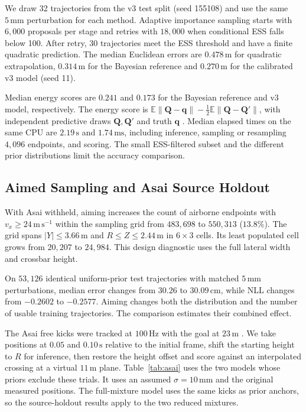 \documentclass[11pt,a4paper]{article}
\begin{document}
We draw 32 trajectories from the v3 test split (seed 155108) and use the same $5\,\mathrm{mm}$ perturbation for each method. Adaptive importance sampling starts with $6{,}000$ proposals per stage and retries with $18{,}000$ when conditional ESS falls below 100. After retry, 30 trajectories meet the ESS threshold and have a finite quadratic prediction. The median Euclidean errors are $0.478\,\mathrm{m}$ for quadratic extrapolation, $0.314\,\mathrm{m}$ for the Bayesian reference and $0.270\,\mathrm{m}$ for the calibrated v3 model (seed 11).

Median energy scores are $0.241$ and $0.173$ for the Bayesian reference and v3 model, respectively. The energy score is $\mathbb E\|\mathbf Q-\mathbf q\|-\tfrac12\mathbb E\|\mathbf Q-\mathbf Q'\|$, with independent predictive draws $\mathbf Q,\mathbf Q'$ and truth $\mathbf q$ \cite{gneiting2007}. Median elapsed times on the same CPU are $2.19\,\mathrm{s}$ and $1.74\,\mathrm{ms}$, including inference, sampling or resampling $4{,}096$ endpoints, and scoring. The small ESS-filtered subset and the different prior distributions limit the accuracy comparison.

\subsection{Aimed Sampling and Asai Source Holdout}
\label{sec:asai}

With Asai withheld, aiming increases the count of airborne endpoints with $v_x\ge24\,\mathrm{m\,s^{-1}}$ within the sampling grid from $483{,}698$ to $550{,}313$ ($13.8\%$). The grid spans $|Y|\le3.66\,\mathrm{m}$ and $R\le Z\le2.44\,\mathrm{m}$ in $6\times3$ cells. Its least populated cell grows from $20{,}207$ to $24{,}984$. This design diagnostic uses the full lateral width and crossbar height.

On $53{,}126$ identical uniform-prior test trajectories with matched $5\,\mathrm{mm}$ perturbations, median error changes from $30.26$ to $30.09\,\mathrm{cm}$, while NLL changes from $-0.2602$ to $-0.2577$. Aiming changes both the distribution and the number of usable training trajectories. The comparison estimates their combined effect.

The Asai free kicks were tracked at $100\,\mathrm{Hz}$ with the goal at $23\,\mathrm{m}$ \cite{asai2020}. We take positions at $0.05$ and $0.10\,\mathrm{s}$ relative to the initial frame, shift the starting height to $R$ for inference, then restore the height offset and score against an interpolated crossing at a virtual $11\,\mathrm{m}$ plane. Table~\ref{tab:asai} uses the two models whose priors exclude these trials. It uses an assumed $\sigma=10\,\mathrm{mm}$ and the original measured positions. The full-mixture model uses the same kicks as prior anchors, so the source-holdout results apply to the two reduced mixtures.
\end{document}
